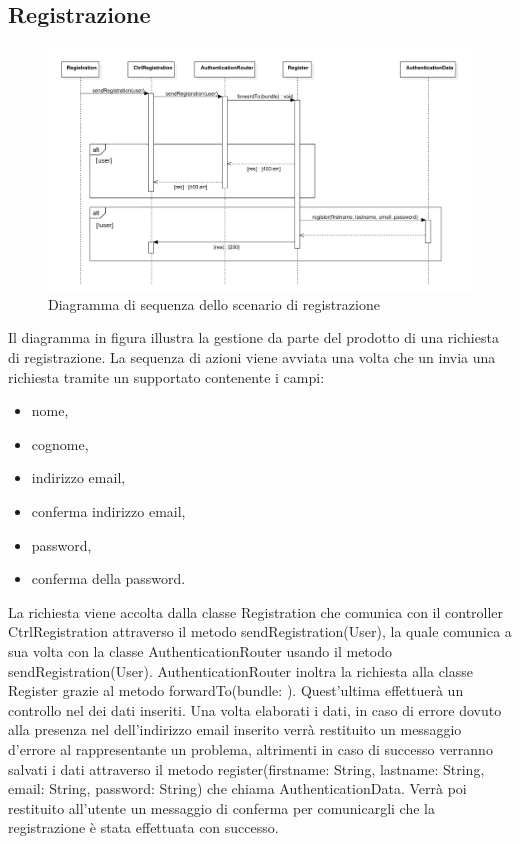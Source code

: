 \documentclass[a4paper, titlepage]{article}
\begin{document}
\subsection{Registrazione}
\begin{figure}[!h]
	\centering
	\includegraphics[scale=0.5]{Img/seq-register.pdf}
	\caption{Diagramma di sequenza dello scenario di registrazione}
\end{figure}
Il diagramma in figura illustra la gestione da parte del prodotto di una richiesta di registrazione. La sequenza di azioni viene avviata una volta che un  invia una richiesta tramite un   supportato contenente i campi: 
\begin{itemize}
	\item nome,
	\item cognome,
	\item indirizzo email,
	\item conferma indirizzo email,
	\item password,
	\item conferma della password.
\end{itemize}
La richiesta viene accolta dalla classe Registration che comunica con il controller CtrlRegistration attraverso il metodo sendRegistration(User), la quale comunica a sua volta con la classe AuthenticationRouter usando il metodo sendRegistration(User).
AuthenticationRouter inoltra la richiesta alla classe Register grazie al metodo forwardTo(bundle: ). Quest'ultima effettuerà un controllo nel  dei dati inseriti. Una volta elaborati i dati, in caso di errore dovuto alla presenza nel  dell'indirizzo email inserito verrà restituito un messaggio d'errore al  rappresentante un problema, altrimenti in caso di successo verranno salvati i dati attraverso il metodo register(firstname: String, lastname: String, email: String, password: String) che chiama AuthenticationData. Verrà poi restituito all'utente un messaggio di conferma per comunicargli che la registrazione è stata effettuata con successo.
\end{document}
